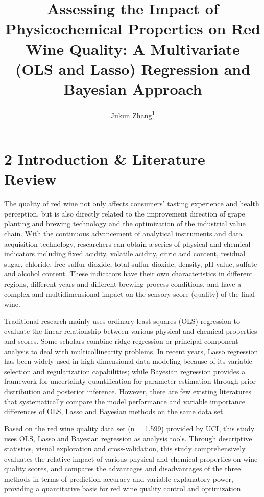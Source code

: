 \documentclass[
  doc,floatsintext]{apa6}
\title{Assessing the Impact of Physicochemical Properties on Red Wine Quality: A Multivariate (OLS and Lasso) Regression and Bayesian Approach}
\author{Jukun Zhang\textsuperscript{1}}
\date{}
\affiliation{\vspace{0.5cm}\textsuperscript{1} Rutgers University}
\begin{document}
\maketitle

\newpage

\section{2 Introduction \& Literature Review}\label{introduction-literature-review}

The quality of red wine not only affects consumers' tasting experience and health perception, but is also directly related to the improvement direction of grape planting and brewing technology and the optimization of the industrial value chain. With the continuous advancement of analytical instruments and data acquisition technology, researchers can obtain a series of physical and chemical indicators including fixed acidity, volatile acidity, citric acid content, residual sugar, chloride, free sulfur dioxide, total sulfur dioxide, density, pH value, sulfate and alcohol content. These indicators have their own characteristics in different regions, different years and different brewing process conditions, and have a complex and multidimensional impact on the sensory score (quality) of the final wine.

Traditional research mainly uses ordinary least squares (OLS) regression to evaluate the linear relationship between various physical and chemical properties and scores. Some scholars combine ridge regression or principal component analysis to deal with multicollinearity problems. In recent years, Lasso regression has been widely used in high-dimensional data modeling because of its variable selection and regularization capabilities; while Bayesian regression provides a framework for uncertainty quantification for parameter estimation through prior distribution and posterior inference. However, there are few existing literatures that systematically compare the model performance and variable importance differences of OLS, Lasso and Bayesian methods on the same data set.

Based on the red wine quality data set (n = 1,599) provided by UCI, this study uses OLS, Lasso and Bayesian regression as analysis tools. Through descriptive statistics, visual exploration and cross-validation, this study comprehensively evaluates the relative impact of various physical and chemical properties on wine quality scores, and compares the advantages and disadvantages of the three methods in terms of prediction accuracy and variable explanatory power, providing a quantitative basis for red wine quality control and optimization.
\end{document}
